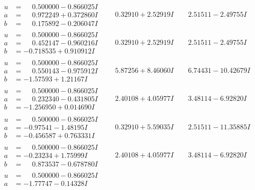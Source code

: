 \documentclass[1p]{elsarticle_modified}
\theoremstyle{definition}
\begin{document}
$$\begin{array}{c|c|c}
\begin{aligned}
u &= \phantom{-}0.500000 - 0.866025 I \\
a &= \phantom{-}0.972249 + 0.372860 I \\
b &= \phantom{-}0.175892 - 0.206047 I\end{aligned}
 & \phantom{-}0.32910 + 2.52919 I & \phantom{-}2.51511 - 2.49755 I \\ \hline\begin{aligned}
u &= \phantom{-}0.500000 - 0.866025 I \\
a &= \phantom{-}0.452147 - 0.960216 I \\
b &= -0.718535 + 0.910912 I\end{aligned}
 & \phantom{-}0.32910 + 2.52919 I & \phantom{-}2.51511 - 2.49755 I \\ \hline\begin{aligned}
u &= \phantom{-}0.500000 - 0.866025 I \\
a &= \phantom{-}0.550143 - 0.975912 I \\
b &= -1.57593 + 1.21167 I\end{aligned}
 & \phantom{-}5.87256 + 8.46060 I & \phantom{-}6.74431 - 10.42679 I \\ \hline\begin{aligned}
u &= \phantom{-}0.500000 - 0.866025 I \\
a &= \phantom{-}0.232340 - 0.431805 I \\
b &= -1.256950 + 0.014690 I\end{aligned}
 & \phantom{-}2.40108 + 4.05977 I & \phantom{-}3.48114 - 6.92820 I \\ \hline\begin{aligned}
u &= \phantom{-}0.500000 - 0.866025 I \\
a &= -0.97541 - 1.48195 I \\
b &= -0.456587 + 0.763331 I\end{aligned}
 & \phantom{-}0.32910 + 5.59035 I & \phantom{-}2.51511 - 11.35885 I \\ \hline\begin{aligned}
u &= \phantom{-}0.500000 - 0.866025 I \\
a &= -0.23234 + 1.75999 I \\
b &= \phantom{-}0.873537 - 0.678780 I\end{aligned}
 & \phantom{-}2.40108 + 4.05977 I & \phantom{-}3.48114 - 6.92820 I \\ \hline\begin{aligned}
u &= \phantom{-}0.500000 - 0.866025 I \\
a &= -1.77747 - 0.14328 I \\

\end{aligned}
\end{array}$$
\end{document}
